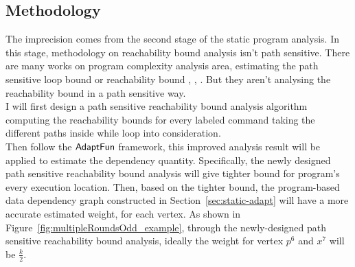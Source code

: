 \subsection{Methodology}
\label{subsec:refine-static-analysis}
The imprecision comes from the second stage of the static program analysis.
In this stage, 
methodology on reachability bound analysis isn't path sensitive. 
There are many works on program complexity analysis area, estimating the path sensitive loop bound 
or reachability bound
\cite{GustafssonEL05, HumenbergerJK18}, 
\cite{BrockschmidtEFFG16,AlbertAGP08,AliasDFG10,Flores-MontoyaH14}, 
\cite{GulwaniZ10, SinnZV17,GulwaniJK09, GulwaniMC09, abs-2203-04243}. 
But they aren't analysing the reachability
bound in a path sensitive way.
\\
I will first design a path sensitive reachability bound analysis algorithm computing the 
reachability bounds for every labeled command taking the different paths inside while loop into consideration.
\\
Then follow the $\textsf{AdaptFun}$ framework,
this improved analysis result will be applied to estimate the dependency quantity.
Specifically, the newly designed path sensitive reachability bound analysis will 
give tighter bound for program's every execution location.
Then, based on the tighter bound,
the program-based data dependency graph constructed in Section~\ref{sec:static-adapt}
will have a more accurate estimated weight, for each vertex.
%
As shown in Figure~\ref{fig:multipleRoundsOdd_example}, 
through the newly-designed path sensitive reachability bound analysis,
ideally the weight for vertex $p^6$ and $x^7$ will be $\frac{k}{2}$.

